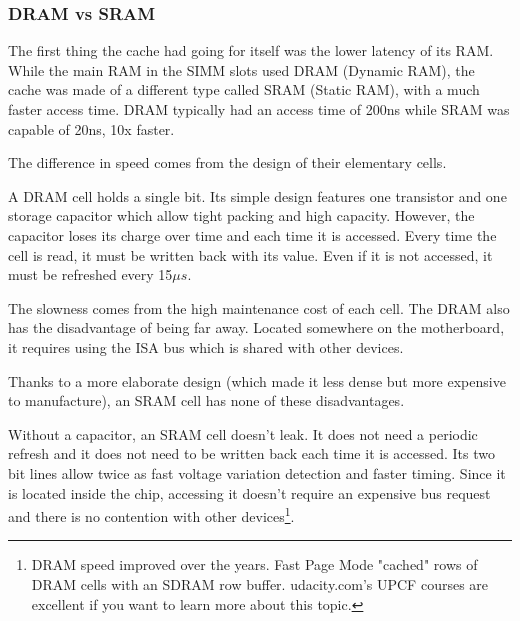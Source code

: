\subsubsection{DRAM vs SRAM}
The first thing the cache had going for itself was the lower latency of its RAM. While the main RAM in the SIMM slots used DRAM (Dynamic RAM), the cache was made of a different type called SRAM (Static RAM), with a much faster access time. DRAM typically had an access time of 200ns while SRAM was capable of 20ns, 10x faster.\\
\par
The difference in speed comes from the design of their elementary cells.\\
\par
 A DRAM cell holds a single bit. Its simple design features one transistor and one storage capacitor which allow tight packing and high capacity. However, the capacitor loses its charge over time and each time it is accessed. Every time the cell is read, it must be written back with its value. Even if it is not accessed, it must be refreshed every 15$\mu s$.\\
\par
{}
\vspace{-5pt}
The slowness comes from the high maintenance cost of each cell. The DRAM also has the disadvantage of being far away. Located somewhere on the motherboard, it requires using the ISA bus which is shared with other devices.\\
\par

\vspace{2mm}
Thanks to a more elaborate design (which made it less dense but more expensive to manufacture), an SRAM cell has none of these disadvantages.\\
\par
{}
\par
Without a capacitor, an SRAM cell doesn't leak. It does not need a periodic refresh and it does not need to be written back each time it is accessed. Its two bit lines allow twice as fast voltage variation detection and faster timing.
Since it is located inside the chip, accessing it doesn't require an expensive bus request and there is no contention with other devices\footnote{DRAM speed improved over the years. Fast Page Mode "cached" rows of DRAM cells with an SDRAM row buffer. udacity.com's UPCF courses are excellent if you want to learn more about this topic.}.
\par











